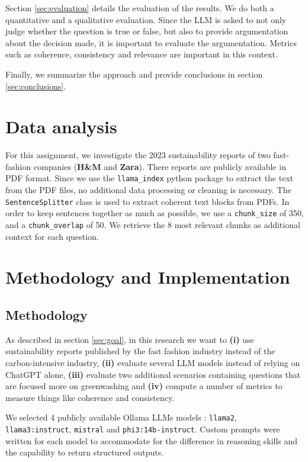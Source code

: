\documentclass[]{article}
\begin{document}
Section \ref{sec:evaluation} details the evaluation of the results.
We do both a quantitative and a qualitative evaluation.
Since the LLM is asked to not only judge whether the question is true or false, but also to provide argumentation about the decision made, it is important to evaluate the argumentation.
Metrics such as coherence, consistency and relevance are important in this context.

Finally, we summarize the approach and provide conclusions in section \ref{sec:conclusions}.

\section{Data analysis} \label{sec:data analysis}

For this assignment, we investigate the 2023 sustainability reports of two fast-fashion companies (\textbf{H\&M} and \textbf{Zara}).
There reports are publicly available in PDF format.
Since we use the \texttt{llama\_index} python package to extract the text from the PDF files, no additional data processing or cleaning is necessary.
The \texttt{SentenceSplitter} class is used to extract coherent text blocks from PDFs.
In order to keep sentences together as much as possible, we use a \texttt{chunk\_size} of 350, and a \texttt{chunk\_overlap} of 50.
We retrieve the 8 most relevant chunks as additional context for each question.

\section{Methodology and Implementation} \label{sec:methodology}

\subsection{Methodology}

As described in section \ref{sec:goal}, in this research we want to \textbf{(i)} use sustainability reports published by the fast fashion industry instead of the carbon-intensive industry, \textbf{(ii)} evaluate several LLM models instead of relying on ChatGPT alone, \textbf{(iii)} evaluate two additional scenarios containing questions that are focused more on greenwashing and \textbf{(iv)} compute a number of metrics to measure things like coherence and consistency.

We selected 4 publicly available Ollama LLMs models : \texttt{llama2}, \texttt{llama3:instruct}, \texttt{mistral} and \texttt{phi3:14b-instruct}.
Custom prompts were written for each model to accommodate for the difference in reasoning skills and the capability to return structured outputs.
\end{document}
